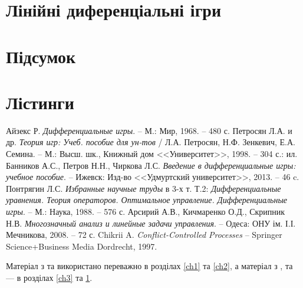 \documentclass{extreport}
\begin{document}
    \chapter{Лінійні диференціальні ігри}\label{ch4}
        
    \chapter*{Підсумок}
        
    \chapter*{Лістинги}
        

    
    \begin{thebibliography}{6}
         Айзекс Р. \emph{Дифференциальные игры}. -- М.: Мир, 1968. -- 480 с.
         Петросян Л.А. и др. \emph{Теория игр: Учеб. пособие для ун-тов }/ Л.А. Петросян, Н.Ф. Зенкевич, Е.А. Семина. -- М.: Высш. шк.,
        Книжный дом <<Университет>>, 1998. -- 304 с.: ил.
         Банников А.С., Петров Н.Н., Чиркова Л.С. \emph{Введение в дифференциальные игры: учебное пособие}. -- Ижевск: Изд-во 
        <<Удмуртский университет>>, 2013. -- 46 c.
         Понтрягин Л.С. \emph{Избранные научные труды} в 3-х т. Т.2: \emph{Дифференциальные уравнения. Теория операторов. Оптимальное управление. Дифференциальные игры}. --
        М.: Наука, 1988. -- 576 с.
         Арсирий А.В., Кичмаренко О.Д., Скрипник Н.В. \emph{Многозначный анализ и линейные задачи управления}. -- Одеса: ОНУ ім. І.І. Мечникова, 2008. -- 72 с.
         Chikrii A. \emph{Conflict-Controlled Processes} -- Springer Science+Business Media Dordrecht, 1997.
    \end{thebibliography}
    Матеріал з \cite{1} та \cite{2} використано переважно в розділах \ref{ch1} та \ref{ch2},
    а матеріал з \cite{3}, \cite{4} та \cite{5} --- в розділах \ref{ch3} та \ref{ch4}.
\end{document}
